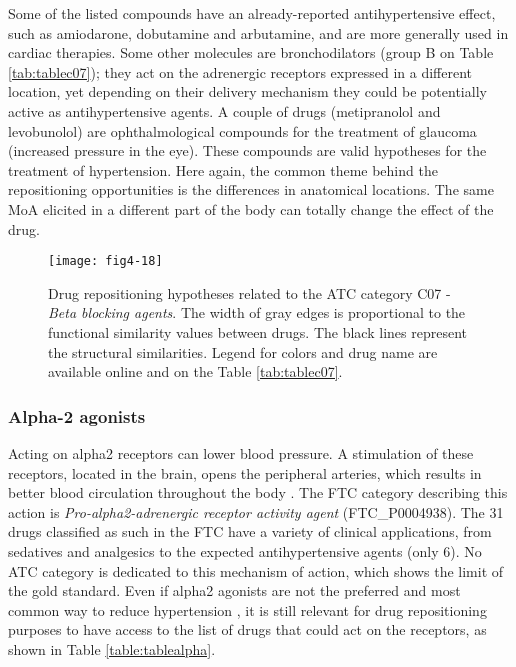 Some of the listed compounds have an already-reported antihypertensive effect, such as amiodarone, dobutamine and arbutamine, and are more generally used in cardiac therapies. Some other molecules are bronchodilators (group B on Table \ref{tab:tablec07}); they act on the adrenergic receptors expressed in a different location, yet depending on their delivery mechanism they could be potentially active as antihypertensive agents. A couple of drugs (metipranolol and levobunolol) are ophthalmological compounds for the treatment of glaucoma (increased pressure in the eye). These compounds are valid hypotheses for the treatment of hypertension. Here again, the common theme behind the repositioning opportunities is the differences in anatomical locations. The same MoA elicited in a different part of the body can totally change the effect of the drug.

\begin{figure}[H]
    \centering
    \texttt{[image: fig4-18]}
    \caption{Drug repositioning hypotheses related to the ATC category C07 - \emph{Beta blocking agents}. The width of gray edges is proportional to the functional similarity values between drugs. The black lines represent the structural similarities. Legend for colors and drug name are available online and on the Table \ref{tab:tablec07}.}
    \label{fig4-18}
\end{figure}

\subsubsection{Alpha-2 agonists}
Acting on alpha2 receptors can lower blood pressure. A stimulation of these receptors, located in the brain, opens the peripheral arteries, which results in better blood circulation throughout the body \citep{swedberg2005task}. The FTC category describing this action is \emph{Pro-alpha2-adrenergic receptor activity agent} (FTC\_P0004938). The 31 drugs classified as such in the FTC have a variety of clinical applications, from sedatives and analgesics to the expected antihypertensive agents (only 6).
No ATC category is dedicated to this mechanism of action, which shows the limit of the gold standard. Even if alpha2 agonists are not the preferred and most common way to reduce hypertension \citep{nelson2010drug}, it is still relevant for drug repositioning purposes to have access to the list of drugs that could act on the receptors, as shown in Table \ref{table:tablealpha}.


